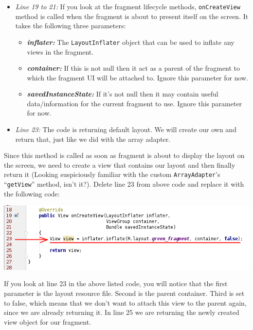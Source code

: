 \begin{itemize}
	\item \textit{Line 19 to 21:} If you look at the fragment lifecycle methods, \texttt{onCreateView} method is called when the fragment is about to present itself on the screen. It takes the following three parameters:
	\begin{itemize}
		\item \textit{\textbf{inflater:}} The \texttt{LayoutInflater} object that can be used to inflate any views in the fragment.
		
		\item \textit{\textbf{container:}} If this is not null then it act as a parent of the fragment to which the fragment UI will be attached to. Ignore this parameter for now.
		
		\item \textit{\textbf{savedInstanceState:}} If it's not null then it may contain useful data/information for the current fragment to use. Ignore this parameter for now.
	\end{itemize}
	
	\item \textit{Line 23:} The code is returning default layout. We will create our own and return that, just like we did with the array adapter.
\end{itemize}

Since this method is called as soon as fragment is about to display the layout on the screen, we need to create a view that contains our layout and then finally return it (Looking suspiciously familiar with the custom \texttt{ArrayAdapter}'s ``\texttt{getView}'' method, isn't it?). Delete line 23 from above code and replace it with the following code:

\begin{center}
	\includegraphics[scale=\SourceCodeScale]{chapters/ch11/images/7}
\end{center}

If you look at line 23 in the above listed code, you will notice that the first parameter is the layout resource file. Second is the parent container. Third is set to false, which means that we don't want to attach this view to the parent again, since we
are already returning it. In line 25 we are returning the newly created view object for our fragment. \\

